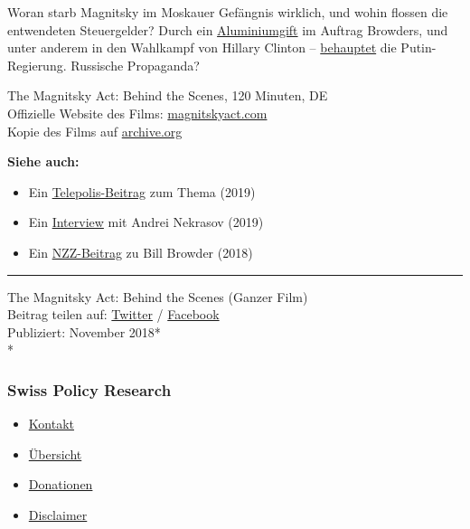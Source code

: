 Woran starb Magnitsky im Moskauer Gefängnis wirklich, und wohin flossen
die entwendeten Steuer­gelder? Durch ein
\href{https://www.newsweek.com/russia-american-bill-browder-poisoning-lawyer-putin-1221857}{Aluminiumgift}
im Auftrag Browders, und unter anderem in den Wahlkampf von Hillary
Clinton -- \href{http://tass.com/world/1013707}{behauptet} die
Putin-Regierung. Russische Propaganda?

The Magnitsky Act: Behind the Scenes, 120 Minuten, DE\\
Offizielle Website des Films:
\href{http://magnitskyact.com/}{magnitskyact.com}\\
Kopie des Films auf
\href{https://archive.org/details/the-magnitsky-act-german}{archive.org}

\textbf{Siehe auch:}

\begin{itemize}
\tightlist
\item
  Ein
  \href{https://www.heise.de/tp/features/Browder-und-das-Magnitski-Narrativ-Ende-einer-Desinformationskampagne-4595245.html}{Telepolis-Beitrag}
  zum Thema (2019)
\item
  Ein \href{https://www.nachdenkseiten.de/?p=48384}{Interview} mit
  Andrei Nekrasov (2019)
\item
  Ein
  \href{https://www.nzz.ch/wirtschaft/bill-browder-putins-groesster-feind-ueber-magnitskis-vermaechtnis-ld.1438224}{NZZ-Beitrag}
  zu Bill Browder (2018)
\end{itemize}

\begin{center}\rule{0.5\linewidth}{\linethickness}\end{center}

The Magnitsky Act: Behind the Scenes (Ganzer Film)\\
Beitrag teilen auf:
\href{https://twitter.com/intent/tweet?url=https://swprs.org/der-fall-magnitsky/}{Twitter}
/
\href{https://www.facebook.com/share.php?u=https://swprs.org/der-fall-magnitsky/}{Facebook}\\
Publiziert: November 2018*\\
*

\hypertarget{swiss-policy-research}{%
\subsubsection{Swiss Policy Research}\label{swiss-policy-research}}

\begin{itemize}
\tightlist
\item
  \href{https://swprs.org/kontakt/}{Kontakt}
\item
  \href{https://swprs.org/uebersicht/}{Übersicht}
\item
  \href{https://swprs.org/donationen/}{Donationen}
\item
  \href{https://swprs.org/disclaimer/}{Disclaimer}
\end{itemize}

